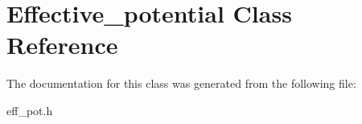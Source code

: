 \hypertarget{classEffective__potential}{}\section{Effective\+\_\+potential Class Reference}
\label{classEffective__potential}


The documentation for this class was generated from the following file\+:\begin{DoxyCompactItemize}
\item 
eff\+\_\+pot.\+h\end{DoxyCompactItemize}

